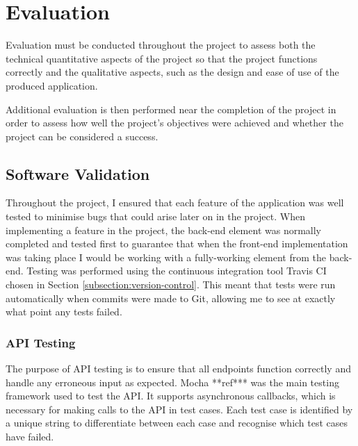 \chapter{Evaluation} \label{chapter:evaluation}

Evaluation must be conducted throughout the project to assess both the technical quantitative aspects of the project so that the project functions correctly and the qualitative aspects, such as the design and ease of use of the produced application.

Additional evaluation is then performed near the completion of the project in order to assess how well the project's objectives were achieved and whether the project can be considered a success.

%

\section{Software Validation}

Throughout the project, I ensured that each feature of the application was well tested to minimise bugs that could arise later on in the project. When implementing a feature in the project, the back-end element was normally completed and tested first to guarantee that when the front-end implementation was taking place I would be working with a fully-working element from the back-end. Testing was performed using the continuous integration tool Travis CI chosen in Section \ref{subsection:version-control}. This meant that tests were run automatically when commits were made to Git, allowing me to see at exactly what point any tests failed.

\subsection{API Testing}

The purpose of API testing is to ensure that all endpoints function correctly and handle any erroneous input as expected. Mocha **ref*** was the main testing framework used to test the API. It supports asynchronous callbacks, which is necessary for making calls to the API in test cases. Each test case is identified by a unique string to differentiate between each case and recognise which test cases have failed.

